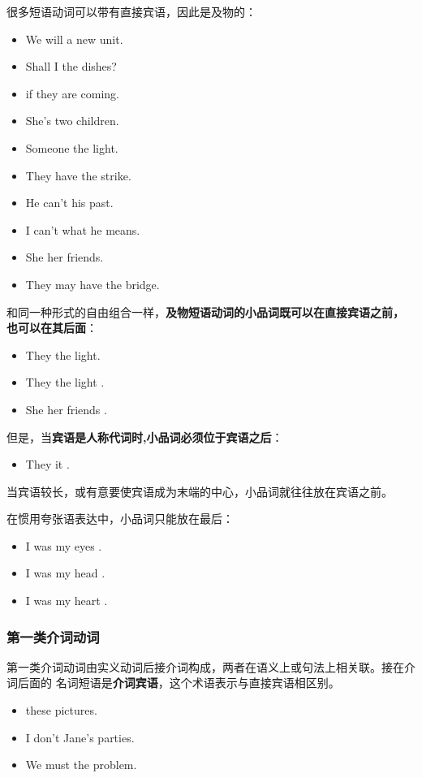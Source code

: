 很多短语动词可以带有直接宾语，因此是及物的：
\begin{itemize}
\item We will  a new unit.
\item Shall I  the dishes?
\item {} if they are coming.
\item She's  two children.
\item Someone  the light.
\item They have  the strike.
\item He can't  his past.
\item I can't  what he means.
\item She  her friends.
\item They may have  the bridge.
\end{itemize}

和同一种形式的自由组合一样，\textbf{及物短语动词的小品词既可以在直接宾语之前，
  也可以在其后面}：
\begin{itemize}
\item They  the light.
\item They  the light .
\item She  her friends .
\end{itemize}

但是，当\textbf{宾语是人称代词时,小品词必须位于宾语之后}：
\begin{itemize}
\item They  it .
\end{itemize}当宾语较长，或有意要使宾语成为末端的中心，小品词就往往放在宾语之前。

在惯用夸张语表达中，小品词只能放在最后：
\begin{itemize}
\item I was  my eyes .
\item I was  my head .
\item I was  my heart .
\end{itemize}

\subsubsection{第一类介词动词}

第一类介词动词由实义动词后接介词构成，两者在语义上或句法上相关联。接在介词后面的
名词短语是\textbf{介词宾语}，这个术语表示与直接宾语相区别。
\begin{itemize}
\item {} these pictures.

\item I don't  Jane's parties.

\item We must  the problem.

\end{itemize}



